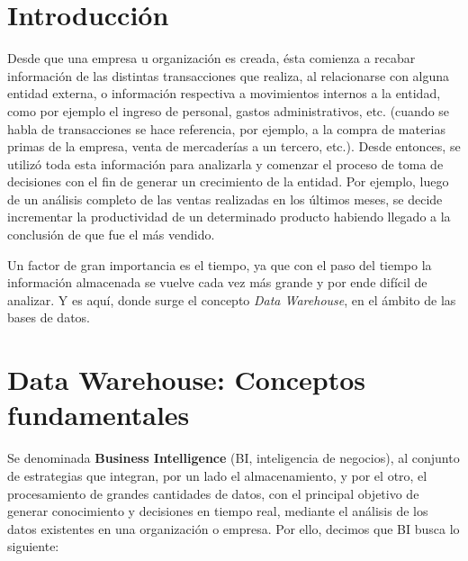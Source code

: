 \documentclass[a4paper,11pt]{article}
\begin{document}
  \newpage\null\thispagestyle{empty}\newpage
  
  \maketitle
  \tableofcontents

    
  
    \section{Introducción} %

    Desde que una empresa u organización es creada, ésta comienza a recabar información de las distintas transacciones que realiza, al relacionarse
    con alguna entidad externa, o información respectiva a movimientos internos a la entidad, como por ejemplo el ingreso de personal, gastos administrativos,
    etc. (cuando se habla de transacciones se hace referencia, por ejemplo, a la compra de materias primas de la empresa, venta de mercaderías a un tercero,
    etc.). Desde entonces, se utilizó toda esta información para analizarla y comenzar el proceso de toma de decisiones con el fin de generar un
    crecimiento de la entidad. Por ejemplo, luego de un análisis completo de las ventas realizadas en los últimos meses, se decide incrementar la 
    productividad de un determinado producto habiendo llegado a la conclusión de que fue el más vendido.
    
    Un factor de gran importancia es el tiempo, ya que con el paso del tiempo la información almacenada se vuelve cada vez más grande 
    y por ende difícil de analizar. Y es aquí, donde surge el concepto \textit{Data Warehouse}, en el ámbito de las bases de datos.

    \vspace{0.5in}
    \section{Data Warehouse: Conceptos fundamentales}
    
    Se denominada \textbf{Business Intelligence} (BI, inteligencia de negocios), al conjunto de estrategias que integran, por un lado el almacenamiento, y
    por el otro, el procesamiento de grandes cantidades de datos, con el principal objetivo de generar conocimiento y decisiones en tiempo real, mediante 
    el análisis de los datos existentes en una organización o empresa. Por ello, decimos que BI busca lo siguiente:
    
\end{document}
